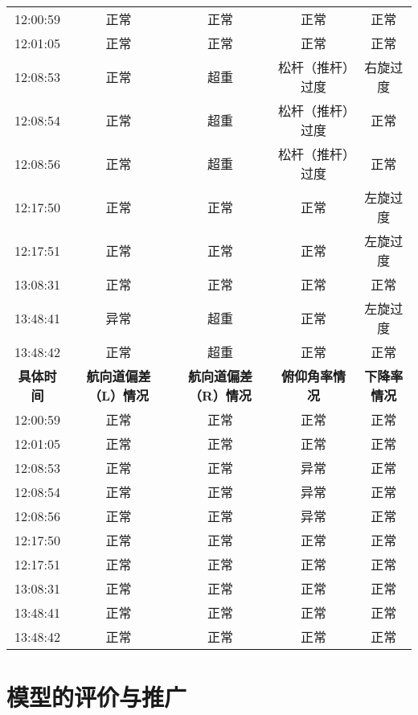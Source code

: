 \documentclass{MathorCupModeling}
\begin{document}
\begin{table}[H]
{\begin{tabular}{ccccc}
	  \midrule
	  12:00:59 & 正常    & 正常    & 正常    & 正常 \\
	  12:01:05 & 正常    & 正常    & 正常    & 正常 \\
	  12:08:53 & 正常    & 超重    & 松杆（推杆）过度 & 右旋过度 \\
	  12:08:54 & 正常    & 超重    & 松杆（推杆）过度 & 正常 \\
	  12:08:56 & 正常    & 超重    & 松杆（推杆）过度 & 正常 \\
	  12:17:50 & 正常    & 正常    & 正常    & 左旋过度 \\
	  12:17:51 & 正常    & 正常    & 正常    & 左旋过度 \\
	  13:08:31 & 正常    & 正常    & 正常    & 正常 \\
	  13:48:41 & 异常    & 超重    & 正常    & 左旋过度 \\
	  13:48:42 & 正常    & 超重    & 正常    & 正常 \\
	  \midrule
	  \textbf{具体时间} & \textbf{航向道偏差（L）情况} & \textbf{航向道偏差（R）情况} & \textbf{俯仰角率情况} & \textbf{下降率情况} \\
	  \midrule
	  12:00:59 & 正常    & 正常    & 正常    & 正常 \\
	  12:01:05 & 正常    & 正常    & 正常    & 正常 \\
	  12:08:53 & 正常    & 正常    & 异常    & 正常 \\
	  12:08:54 & 正常    & 正常    & 异常    & 正常 \\
	  12:08:56 & 正常    & 正常    & 异常    & 正常 \\
	  12:17:50 & 正常    & 正常    & 正常    & 正常 \\
	  12:17:51 & 正常    & 正常    & 正常    & 正常 \\
	  13:08:31 & 正常    & 正常    & 正常    & 正常 \\
	  13:48:41 & 正常    & 正常    & 正常    & 正常 \\
	  13:48:42 & 正常    & 正常    & 正常    & 正常 \\
	  \bottomrule
	  \end{tabular}}
	\label{tab:仿真结果部分}
  \end{table}
  
\section{模型的评价与推广}
\end{document}
